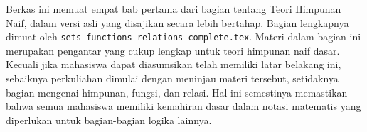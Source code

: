 \documentclass[../../include/open-logic-part]{subfiles}
\begin{document}

\begin{editorial}
  Berkas ini memuat empat bab pertama dari bagian tentang Teori Himpunan
  Naif, dalam versi asli yang disajikan secara lebih bertahap. Bagian lengkapnya dimuat oleh
  \verb|sets-functions-relations-complete.tex|. Materi dalam bagian ini
  merupakan pengantar yang cukup lengkap untuk teori himpunan naif dasar.
  Kecuali jika mahasiswa dapat diasumsikan telah memiliki latar belakang ini,
  sebaiknya perkuliahan dimulai dengan meninjau materi tersebut, setidaknya
  bagian mengenai himpunan, fungsi, dan relasi. Hal ini semestinya memastikan
  bahwa semua mahasiswa memiliki kemahiran dasar dalam notasi matematis yang
  diperlukan untuk bagian-bagian logika lainnya.
\end{editorial}





\OLEndPartHook
\end{document}
